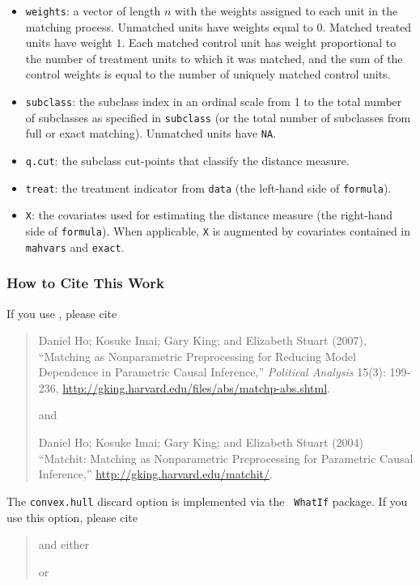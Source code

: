 \begin{itemize}
\item \texttt{weights}: a vector of length $n$ with the weights
  assigned to each unit in the matching process.  Unmatched units have
  weights equal to $0$. Matched treated units have weight $1$.  Each
  matched control unit has weight proportional to the number of
  treatment units to which it was matched, and the sum of the control
  weights is equal to the number of uniquely matched control units.
 
\item \texttt{subclass}: the subclass index in an ordinal scale from 1
  to the total number of subclasses as specified in \texttt{subclass}
  (or the total number of subclasses from full or exact matching).
  Unmatched units have \texttt{NA}.
  
\item \texttt{q.cut}: the subclass cut-points that classify the
  distance measure.
  
\item \texttt{treat}: the treatment indicator from \texttt{data} (the
  left-hand side of \texttt{formula}).
 
\item \texttt{X}: the covariates used for estimating the distance
  measure (the right-hand side of \texttt{formula}).  When applicable,
  \texttt{X} is augmented by covariates contained in \texttt{mahvars}
  and \texttt{exact}.
\end{itemize}

\subsubsection{How to Cite This Work}

If you use \MatchIt, please cite\nocite{HoImaKin07,HoImaKin04}
\begin{verse}
  Daniel Ho; Kosuke Imai; Gary King; and Elizabeth Stuart (2007),
  ``Matching as Nonparametric Preprocessing for Reducing Model
  Dependence in Parametric Causal Inference,'' \emph{Political
    Analysis} 15(3): 199-236,
  \url{http://gking.harvard.edu/files/abs/matchp-abs.shtml}.


and 

Daniel Ho; Kosuke Imai; Gary King; and Elizabeth Stuart (2004)
``Matchit: Matching as Nonparametric Preprocessing for Parametric
Causal Inference,'' \url{http://gking.harvard.edu/matchit/}.
\end{verse}

The {\tt convex.hull} discard option is implemented via the {\tt
  WhatIf} package.  If you use this option, please cite
\begin{verse}

and either


or

\end{verse} 

